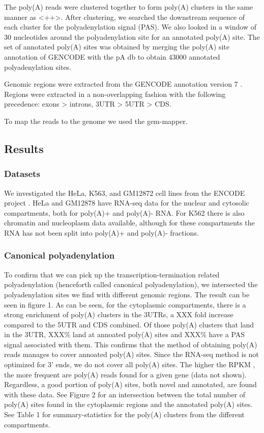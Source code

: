 \documentclass[a4paper]{article}
\begin{document}
The poly(A) reads were clustered together to form poly(A) clusters in the same
manner as \cite{}<++>. After clustering, we searched the downstream sequence of
each cluster for the polyadenylation signal (PAS). We also looked in a window
of 30 nucleotides around the polyadenylation site for an annotated
poly(A) site. The set of annotated poly(A) sites was obtained by merging the
poly(A) site annotation of GENCODE with the pA db\cite{} to obtain 43000
annotated polyadenylation sites.

Genomic regions were extracted from the GENCODE annotation version 7
\cite{}. Regions were extracted in a non-overlapping fashion with the following
precedence: exons > introns, 3UTR > 5UTR > CDS.

To map the reads to the genome we used the gem-mapper.

\subsection{Results}
\subsubsection{Datasets}
We investigated the HeLa, K563, and GM12872 cell lines from the ENCODE project
\cite{}. HeLa and GM12878 have RNA-seq data for the nuclear and cytosolic
compartments, both for poly(A)+ and poly(A)- RNA. For K562 there is also
chromatin and nucleoplasm data available, although for these compartments the
RNA has not been split into poly(A)+ and poly(A)- fractions.

\subsubsection{Canonical polyadenylation}
To confirm that we can pick up the transcription-termination related
polyadenylation (henceforth called canonical polyadenylation), we intersected
the polyadenylation sites we find with different genomic regions. The result
can be seen in figure 1. As can be seen, for the cytoplasmic compartments,
there is a strong enrichment of poly(A) clusters in the 3UTRs, a XXX fold
increase compared to the 5UTR and CDS combined. Of those poly(A) clusters that
land in the 3UTR, XXX\% land at annoated poly(A) sites and XXX\% have a PAS
signal associated with them. This confirms that the method of obtaining poly(A)
reads manages to cover annoated poly(A) sites. Since the RNA-seq method is not
optimized for 3' ends, we do not cover all poly(A) sites. The higher the RPKM
, the more frequent are poly(A) reads found for a given gene (data not shown).
Regardless, a good portion of poly(A) sites, both novel and annotated, are
found with these data. See Figure 2 for an intersection between the total
number of poly(A) sites found in the cytoplasmic regions and the annotated
poly(A) sites. See Table 1 for summary-statistics for the poly(A) clusters from
the different compartments.



\end{document}
